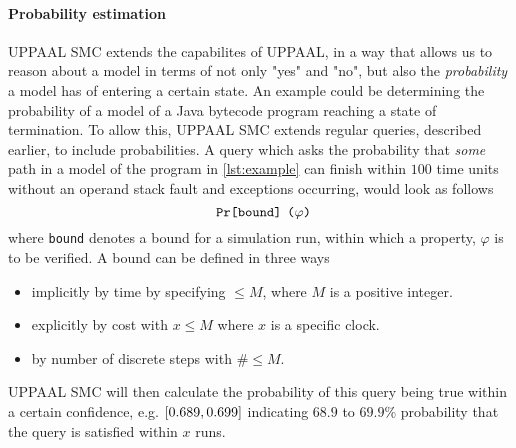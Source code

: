 \paragraph{Probability estimation}
UPPAAL SMC extends the capabilites of UPPAAL, in a way that allows us to reason about a model in terms of not only "yes" and "no", but also the \textit{probability} a model has of entering a certain state. An example could be determining the probability of a model of a Java bytecode program reaching a state of termination. To allow this, UPPAAL SMC extends regular queries, described earlier, to include probabilities. A query which asks the probability that \textit{some} path in a model of the program in \cref{lst:example} can finish within $100$ time units without an operand stack fault and exceptions occurring, would look as follows\\
$$\texttt{Pr\relax[bound\relax] ($\varphi$)}$$
where \texttt{bound} denotes a bound for a simulation run, within which a property, $\varphi$ is to be verified. A bound can be defined in three ways~\cite[p. 402]{smc}

\begin{itemize}
\item implicitly by time by specifying $\leq M$, where $M$ is a positive integer.
\item explicitly by cost with $x \leq M$ where $x$ is a specific clock.
\item by number of discrete steps with $\# \leq M$. 
\end{itemize}

UPPAAL SMC will then calculate the probability of this query being true within a certain confidence, e.g. $\relax[0.689, 0.699]$ indicating $68.9$ to $69.9\%$ probability that the query is satisfied within $x$ runs.


